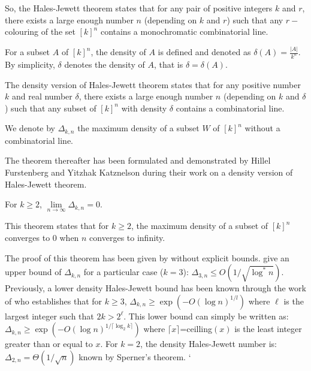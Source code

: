 So, the Hales-Jewett theorem states that for any pair of positive integers $k$ and $r$, there exists a large enough number $n$ (depending on $k$ and $r$) such that  any $r-$colouring of the set  $[k]^n $ contains a monochromatic combinatorial line.

For a subset $A$ of $[k]^n$, the density of $A$ is defined and denoted as $\delta(A)=\frac{|A|}{k^n}.$ By simplicity, $\delta$ denotes the density of $A$, that is $\delta=\delta(A).$

The density version of Hales-Jewett theorem states that for any positive number $k$ and real number $\delta$,  there exists a large enough number $n$ (depending on $k$ and $\delta$) such that  any subset of  $[k]^n $ with density $\delta$ contains a combinatorial line.

We denote by $\Delta_{k,n}$ the maximum density of a subset $W$ of $[k]^n$ without a combinatorial line. 

The theorem thereafter has been formulated and demonstrated  by Hillel Furstenberg and Yitzhak Katznelson  during their work on a density version of Hales-Jewett theorem. 

\begin{thm}	For $k\geq 2$, $\lim\limits_{n\longrightarrow \infty} \Delta_{k,n}=0.$ \label{fk}	\end{thm}
 
This theorem states that for $k\geq 2$, the maximum  density of a subset of $[k]^n$ converges to $0$ when $n$ converges to infinity.

The proof of this theorem has been given by \cite{furstenberg1991density} without explicit bounds. \cite{polymath2012new} give an upper bound of $\Delta_{k,n}$ for a particular case ($k=3$): $\Delta_{3,n} \leq O(1/\sqrt{\log^* n}).$ Previously, a lower  density Hales-Jewett bound  has been known through the work of \cite{polymath2010density} who establishes that  for $k\geq 3$, $\Delta_{k,n} \geq \exp \left(-O(\log n)^{1/l}\right)$ where $\ell$ is the largest integer such that $2k > 2^{\ell}$. This lower bound can simply be written as: $\Delta_{k,n} \geq \exp \left(-O(\log n)^{1/\lceil \log_2 k \rceil}\right)$ where $\lceil x \rceil$=ceilling$(x)$ is the least integer greater than or equal to $x.$ For $k=2$, the density Hales-Jewett number is: $\Delta_{2,n}=\Theta(1/\sqrt{n})$ known by Sperner's theorem.
`

